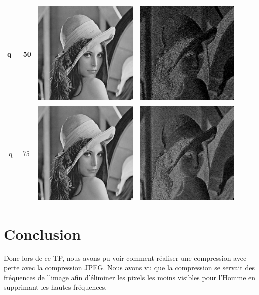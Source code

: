 \documentclass[a4paper,11pt]{article}
\begin{document}
\begin{tabular}{|c|c|c|}
   q = 50 & \includegraphics[width=5cm]{lena_q50.png} & \includegraphics[width=5cm]{lena_q50_diff.png} \\
   \hline
   q = 75 & \includegraphics[width=5cm]{lena_q75.png} & \includegraphics[width=5cm]{lena_q75_diff.png} \\
   \hline
  \end{tabular}

  
  
  \section{Conclusion}
  Donc lors de ce TP, nous avons pu voir comment réaliser une compression avec perte avec la compression JPEG. Nous avons vu
  que la compression se servait des fréquences de l'image afin d'éliminer les pixels les moins visibles pour l'Homme en supprimant
  les hautes fréquences.
  
\end{document}
